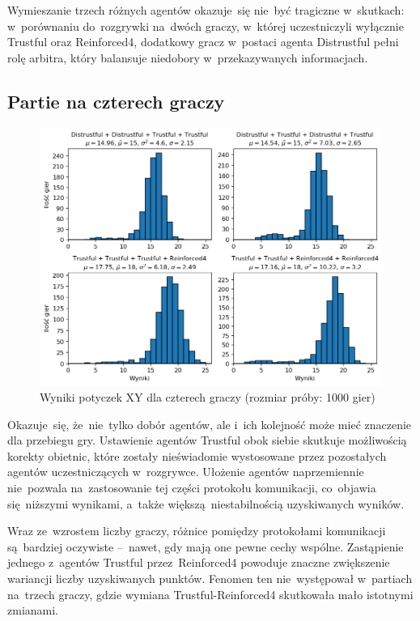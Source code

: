 \documentclass[declaration,shortabstract,inz]{iithesis}
\begin{document}
Wymieszanie trzech różnych agentów okazuje~się nie~być tragiczne w~skutkach: w~porównaniu do~rozgrywki na~dwóch graczy, w~której uczestniczyli wyłącznie Trustful oraz Reinforced4, dodatkowy gracz w~postaci agenta Distrustful pełni rolę arbitra, który balansuje niedobory w~przekazywanych informacjach.

\subsection{Partie na czterech graczy}

\begin{figure}[H]
	\centering
	\captionsetup{format=hang}
	\includegraphics[width=\textwidth,height=\textheight,keepaspectratio]{XY4.png}
	\caption[Caption]{Wyniki potyczek XY dla czterech graczy (rozmiar próby: 1000 gier)}
	\label{fig:XY4}
\end{figure}

Okazuje~się, że~nie~tylko dobór agentów, ale i~ich kolejność może mieć znaczenie dla przebiegu gry. Ustawienie agentów Trustful obok siebie skutkuje możliwością korekty obietnic, które zostały nieświadomie wystosowane przez pozostałych agentów uczestniczących w~rozgrywce. Ułożenie agentów naprzemiennie nie~pozwala na~zastosowanie tej części protokołu komunikacji, co~objawia się~niższymi wynikami, a~także większą niestabilnością uzyskiwanych wyników.

Wraz ze~wzrostem liczby graczy, różnice pomiędzy protokołami komunikacji są~bardziej oczywiste --~nawet, gdy mają one pewne cechy wspólne. Zastąpienie jednego z~agentów Trustful przez~Reinforced4 powoduje znaczne zwiększenie wariancji liczby uzyskiwanych punktów. Fenomen ten nie~występował w~partiach na~trzech graczy, gdzie wymiana Trustful-Reinforced4 skutkowała mało istotnymi zmianami.
\end{document}
